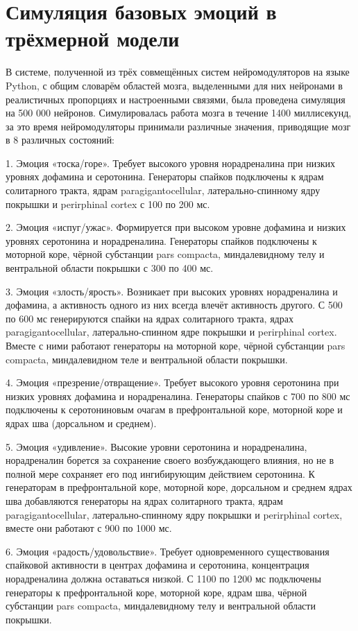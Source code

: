 \chapter{Симуляция базовых эмоций в трёхмерной модели}
\label{chap:results}
В системе, полученной из трёх совмещённых систем нейромодуляторов на языке Python, с общим словарём областей мозга, выделенными для них нейронами в реалистичных пропорциях и настроенными связями, была проведена симуляция на 500 000 нейронов. Симулировалась работа мозга в течение 1400 миллисекунд, за это время нейромодуляторы принимали различные значения, приводящие мозг в 8 различных состояний:


1. Эмоция «тоска/горе». Требует высокого уровня норадреналина при низких уровнях дофамина и серотонина. Генераторы спайков подключены к ядрам солитарного тракта, ядрам paragigantocellular, латерально-спинному ядру покрышки и perirphinal cortex с 100 по 200 мс.


2. Эмоция «испуг/ужас». Формируется при высоком уровне дофамина и низких уровнях серотонина и норадреналина. Генераторы спайков подключены к моторной коре, чёрной субстанции pars compacta, миндалевидному телу и вентральной области покрышки с 300 по 400 мс.


3. Эмоция «злость/ярость». Возникает при высоких уровнях норадреналина и  дофамина, а активность одного из них всегда влечёт активность другого. С 500 по 600 мс генерируются спайки на ядрах солитарного тракта, ядрах paragigantocellular, латерально-спинном ядре покрышки и perirphinal cortex. Вместе с ними работают генераторы на моторной коре, чёрной субстанции pars compacta, миндалевидном теле и вентральной области покрышки.


4. Эмоция «презрение/отвращение». Требует высокого уровня серотонина при низких уровнях дофамина и норадреналина. Генераторы спайков с 700 по 800 мс подключены к серотониновым очагам в префронтальной коре, моторной коре и ядрах шва (дорсальном и среднем).


5. Эмоция «удивление». Высокие уровни серотонина и норадреналина, норадреналин борется за сохранение своего возбуждающего влияния, но не в полной мере сохраняет его под ингибирующим действием серотонина. К генераторам в префронтальной коре, моторной коре, дорсальном и среднем ядрах шва добавляются генераторы на ядрах солитарного тракта, ядрам paragigantocellular, латерально-спинному ядру покрышки и perirphinal cortex, вместе они работают с 900 по 1000 мс.


6. Эмоция «радость/удовольствие». Требует одновременного существования спайковой активности в центрах дофамина и серотонина, концентрация норадреналина должна оставаться низкой. С 1100 по 1200 мс подключены генераторы к префронтальной коре, моторной коре, ядрам шва, чёрной субстанции pars compacta, миндалевидному телу и вентральной области покрышки.


